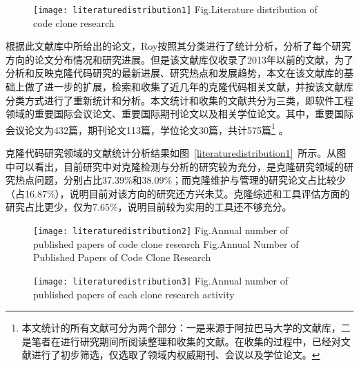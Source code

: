 \begin{figure}[htbp]
\centering
\texttt{[image: literaturedistribution1]}
{Fig.$\!$}{Literature distribution of code clone research}
\vspace{-1em}
\end{figure}

根据此文献库中所给出的论文，Roy按照其分类进行了统计分析，分析了每个研究方向的论文分布情况和研究进展\cite{roy2014vision}。但是该文献库仅收录了2013年以前的文献，为了分析和反映克隆代码研究的最新进展、研究热点和发展趋势，本文在该文献库的基础上做了进一步的扩展，检索和收集了近几年的克隆代码相关文献，并按该文献库分类方式进行了重新统计和分析。本文统计和收集的文献共分为三类，即软件工程领域的重要国际会议论文、重要国际期刊论文以及相关学位论文。其中，重要国际会议论文为432篇，期刊论文113篇，学位论文30篇，共计575篇\footnote{本文统计的所有文献可分为两个部分：一是来源于阿拉巴马大学的文献库，二是笔者在进行研究期间所阅读整理和收集的文献。在收集的过程中，已经对文献进行了初步筛选，仅选取了领域内权威期刊、会议以及学位论文。} 。

克隆代码研究领域的文献统计分析结果如图~\ref{literaturedistribution1}~所示。从图中可以看出，目前研究中对克隆检测与分析的研究较为充分，是克隆研究领域的研究热点问题，分别占比37.39\%和38.09\%；而克隆维护与管理的研究论文占比较少（占16.87\%），说明目前对该方向的研究还方兴未艾。克隆综述和工具评估方面的研究占比更少，仅为7.65\%，说明目前较为实用的工具还不够充分。

\begin{figure}[htbp]
\centering
\texttt{[image: literaturedistribution2]}
{Fig.$\!$}{Annual number of published papers of code clone research}
{Fig.$\!$}{Annual Number of Published Papers of Code Clone Research}
\vspace{-1em}
\end{figure}

\begin{figure}[htbp]
\centering
\texttt{[image: literaturedistribution3]}
{Fig.$\!$}{Annual number of published papers of each clone research activity}
\end{figure}


